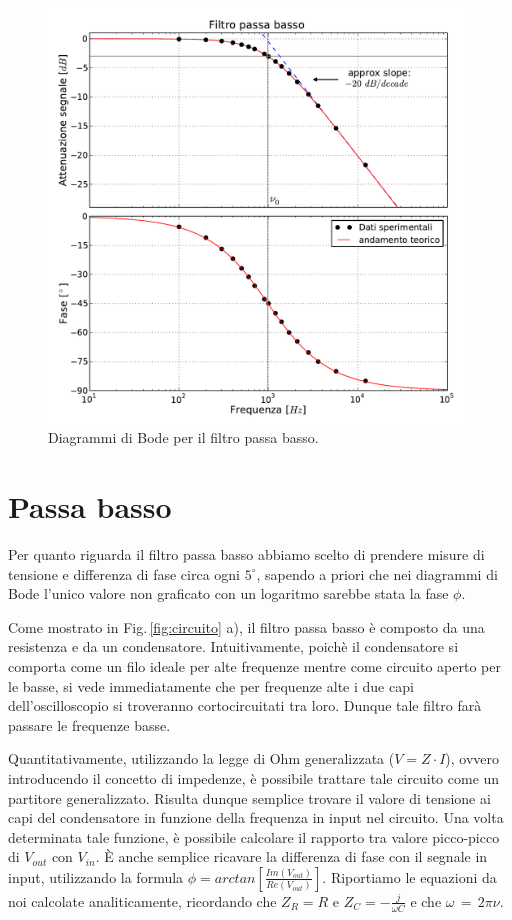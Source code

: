 \begin{figure}
    \includegraphics[width=110mm]{low.pdf}
    \caption{Diagrammi di Bode per il filtro passa basso.}
    \label{fig:low}
\end{figure}
\section{Passa basso}
Per quanto riguarda il filtro passa basso abbiamo scelto di prendere misure di tensione e differenza di fase circa ogni $5^{\circ}$, sapendo a priori che nei diagrammi di Bode l'unico valore non graficato con un logaritmo sarebbe stata la fase $\phi$.

Come mostrato in Fig.$\,$\ref{fig:circuito} a), il filtro passa basso è composto da una resistenza e da un condensatore. Intuitivamente, poichè il condensatore si comporta come un filo ideale per alte frequenze mentre come circuito aperto per le basse, si vede immediatamente che per frequenze alte i due capi dell'oscilloscopio si troveranno cortocircuitati tra loro. Dunque tale filtro farà passare le frequenze basse.

Quantitativamente, utilizzando la legge di Ohm generalizzata ($V=Z \cdot I$), ovvero introducendo il concetto di impedenze, è possibile trattare tale circuito come un partitore generalizzato. Risulta dunque semplice trovare il valore di tensione ai capi del condensatore in funzione della frequenza in input nel circuito. Una volta determinata tale funzione, è possibile calcolare il rapporto tra valore picco-picco di $V_{out}$ con $V_{in}$. \`E anche semplice ricavare la differenza di fase con il segnale in input, utilizzando la formula $\phi=arctan[\frac{Im(V_{out})}{Re(V_{out})}]$. Riportiamo le equazioni da noi calcolate analiticamente, ricordando che $Z_R=R$ e $Z_C=-\frac{j}{\omega C}$ e che $\omega\,=\,2\pi\nu$.

